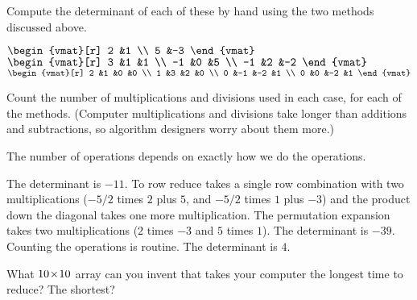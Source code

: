 \begin{exercises}
\begin{answer}
    \end{answer}
  \item 
    Compute the determinant of each of these by hand using the 
    two methods discussed above.
    \begin{exparts*}
      \partsitem $\begin{vmat}[r]
                    2  &1  \\
                    5  &-3
                  \end{vmat}$
      \partsitem $\begin{vmat}[r]
                    3  &1  &1  \\
                   -1  &0  &5  \\
                   -1  &2  &-2 
                  \end{vmat}$
      \partsitem $\begin{vmat}[r]
                    2  &1  &0  &0  \\
                    1  &3  &2  &0  \\
                    0  &-1 &-2 &1  \\
                    0  &0  &-2 &1
                  \end{vmat}$
    \end{exparts*}
    Count the number of multiplications and divisions used in each case,
    for each of the methods.
    (Computer multiplications and divisions take 
     longer than additions and subtractions, so algorithm 
     designers worry about them more.)
     \begin{answer}
       The number of operations depends on exactly how we do the operations.
       \begin{exparts}
         \partsitem The determinant is $-11$.
           To row reduce takes a single row combination 
           with two multiplications
           ($-5/2$ times $2$ plus $5$, and $-5/2$ times $1$ plus $-3$)
           and the product down the diagonal takes one more multiplication.
           The permutation expansion takes two multiplications ($2$ times
           $-3$ and $5$ times $1$).
         \partsitem The determinant is $-39$.
           Counting the operations is routine.
         \partsitem The determinant is $4$.
       \end{exparts}
     \end{answer}
  \item 
    What $10 \! \times \! 10$ array can you invent that takes your computer
    the longest time to reduce?
    The shortest?
    \begin{answer}

\end{answer}
\end{exercises}
